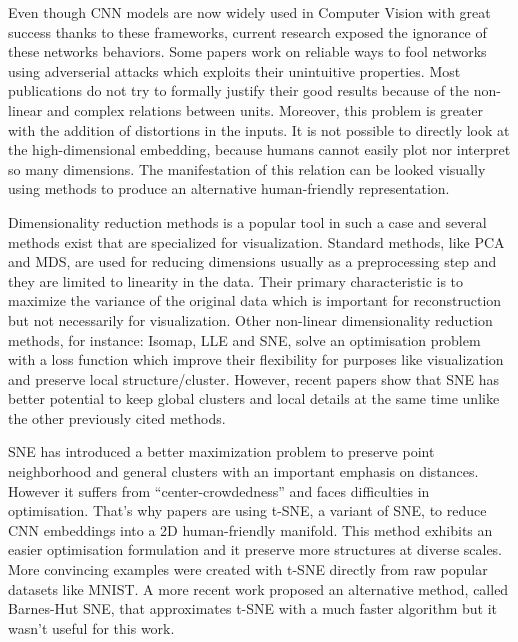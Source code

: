 \documentclass[a4paper,12pt]{report}
\begin{document}
Even though CNN models are now widely used in Computer Vision with great success thanks to these frameworks, current research exposed the ignorance of these networks behaviors.
Some papers work on reliable ways to fool networks using adverserial attacks which exploits their unintuitive properties\cite{szegedy2013intriguing}.
Most publications do not try to formally justify their good results because of the non-linear and complex relations between units. %
Moreover, this problem is greater with the addition of distortions in the inputs.
It is not possible to directly look at the high-dimensional embedding, because humans cannot easily plot nor interpret so many dimensions.
The manifestation of this relation can be looked visually using methods to produce an alternative human-friendly representation.

Dimensionality reduction methods is a popular tool in such a case\cite{dai2014document}\cite{taylor2011learning} and several methods exist that are specialized for visualization.
Standard methods, like PCA and MDS\cite{cox2000multidimensional}, are used for reducing dimensions usually as a preprocessing step and they are limited to linearity in the data.
Their primary characteristic is to maximize the variance of the original data which is important for reconstruction but not necessarily for visualization.
Other non-linear dimensionality reduction methods, for instance: Isomap\cite{tenenbaum2000global}, LLE\cite{roweis2000nonlinear} and SNE\cite{SNE}, solve an optimisation problem with a loss function which improve their flexibility for purposes like visualization and preserve local structure/cluster.
However, recent papers show that SNE has better potential to keep global clusters and local details at the same time unlike the other previously cited methods\cite{SNE}.

SNE has introduced a better maximization problem to preserve point neighborhood and general clusters with an important emphasis on distances\cite{SNE}.
However it suffers from ``center-crowdedness'' and faces difficulties in optimisation\cite{t-SNE}.
That's why papers are using t-SNE, a variant of SNE, to reduce CNN embeddings into a 2D human-friendly manifold. %
This method exhibits an easier optimisation formulation and it preserve more structures at diverse scales.
More convincing examples were created with t-SNE directly from raw popular datasets\cite{van2009new} like MNIST\cite{t-SNE}.
A more recent work proposed an alternative method, called Barnes-Hut SNE, that approximates t-SNE with a much faster algorithm but it wasn't useful for this work.
\end{document}
